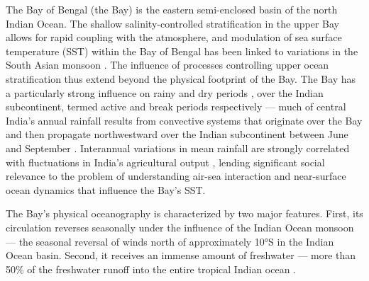 \documentclass[onecol]{ametsoc}
\begin{document}
The Bay of Bengal (the Bay) is the eastern semi-enclosed basin of the north Indian Ocean. 
The shallow salinity-controlled stratification in the upper Bay allows for rapid coupling with the atmosphere, and modulation of sea surface temperature (SST) within the Bay of Bengal has been linked to variations in the South Asian monsoon \citep[e.g.,][]{Vecchi2002,Roxy2014}. 
The influence of processes controlling upper ocean stratification thus extend beyond the physical footprint of the Bay. 
The Bay has a particularly strong influence on rainy and dry periods , over the Indian subcontinent, termed active and break periods respectively --- much of central India's annual rainfall results from convective systems that originate over the Bay and then propagate northwestward over the Indian subcontinent between June and September \citep{Gadgil2003a,Goswami2003}.
Interannual variations in mean rainfall are strongly correlated with fluctuations in India's agricultural output \citep{Gadgil2006}, lending significant social relevance to the problem of understanding air-sea interaction and near-surface ocean dynamics that influence the Bay's SST.


The Bay's physical oceanography is characterized by two major features.
First, its circulation reverses seasonally under the influence of the Indian Ocean monsoon --- the seasonal reversal of winds north of approximately 10°S in the Indian Ocean basin.
Second, it receives an immense amount of freshwater --- more than 50\% of the freshwater runoff into the entire tropical Indian ocean \citep{Sengupta2006,Gordon2016}.
\end{document}
